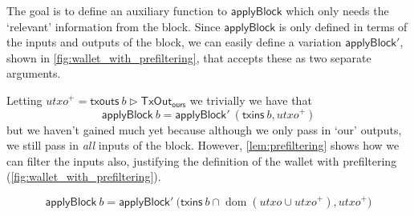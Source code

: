 \documentclass{article}
\newcommand{\restrictrange}{\rhd}
\DeclareMathOperator{\dom}{dom}
\theoremstyle{definition}{
  \newtheorem{lemma}{Lemma}[section] %
  \newtheorem{definition}[lemma]{Definition}
}
\theoremstyle{theorem}{
  \newtheorem{invariant}[lemma]{Invariant}
  \newtheorem{proofobligation}[lemma]{Proof Obligation}
}
\numberwithin{equation}{lemma}
\begin{document}
The goal is to define an auxiliary function to $\mathsf{applyBlock}$ which only
needs the `relevant' information from the block. Since
$\mathsf{applyBlock}$ is only defined in terms of the inputs and outputs
of the block, we can easily define a variation $\mathsf{applyBlock}'$,
shown in \cref{fig:wallet_with_prefiltering}, that accepts these as two
separate arguments.

Letting
%
\begin{math}
\mathit{utxo}^+ = \mathsf{txouts} ~ b \restrictrange \mathsf{TxOut_{ours}}
\end{math}
%
we trivially we have that
%
\begin{equation*}
  \mathsf{applyBlock} ~ b
= \mathsf{applyBlock}' ~ (\mathsf{txins} ~ b, \mathit{utxo}^+)
\end{equation*}
%
but we haven't gained much yet because although we only pass in `our' outputs,
we still pass in \emph{all} inputs of the block.  However,
\cref{lem:prefiltering} shows how we can filter the inputs also, justifying
the definition of the wallet with prefiltering
(\cref{fig:wallet_with_prefiltering}).

\begin{lemma}
\begin{equation*}
  \mathsf{applyBlock} ~ b
= \mathsf{applyBlock}' ~ \Big( \mathsf{txins} ~ b \cap \dom (\mathit{utxo} \cup \mathit{utxo}^+), \mathit{utxo}^+ \Bigr)
\end{equation*}
\label{lem:prefiltering}
\end{lemma}
\end{document}
